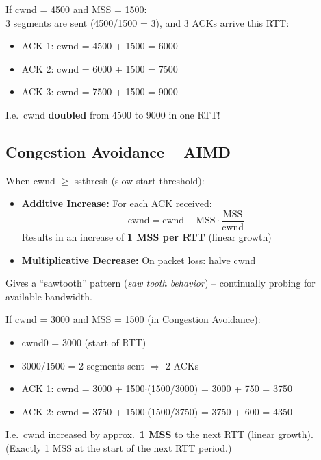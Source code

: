 \begin{exambox}
If cwnd = 4500 and MSS = 1500:\\
3 segments are sent (4500/1500 = 3), and 3 ACKs arrive this RTT:
\begin{itemize}[noitemsep]
    \item ACK 1: cwnd = 4500 + 1500 = 6000
    \item ACK 2: cwnd = 6000 + 1500 = 7500
    \item ACK 3: cwnd = 7500 + 1500 = 9000
\end{itemize}
I.e.\ cwnd \textbf{doubled} from 4500 to 9000 in one RTT!
\end{exambox}

\subsection{Congestion Avoidance -- AIMD}

\begin{keybox}
When cwnd $\geq$ ssthresh (slow start threshold):
\begin{itemize}[noitemsep]
    \item \textbf{Additive Increase:} For each ACK received:
    \[
    \text{cwnd} = \text{cwnd} + \text{MSS} \cdot \frac{\text{MSS}}{\text{cwnd}}
    \]
    Results in an increase of \textbf{1 MSS per RTT} (linear growth)
    \item \textbf{Multiplicative Decrease:} On packet loss: halve cwnd
\end{itemize}
Gives a ``sawtooth'' pattern (\emph{saw tooth behavior}) -- continually probing for available bandwidth.
\end{keybox}

\begin{exambox}
If cwnd = 3000 and MSS = 1500 (in Congestion Avoidance):
\begin{itemize}[noitemsep]
    \item cwnd0 = 3000 (start of RTT)
    \item 3000/1500 = 2 segments sent $\Rightarrow$ 2 ACKs
    \item ACK 1: cwnd = 3000 + 1500$\cdot$(1500/3000) = 3000 + 750 = 3750
    \item ACK 2: cwnd = 3750 + 1500$\cdot$(1500/3750) = 3750 + 600 = 4350
\end{itemize}
I.e.\ cwnd increased by approx.\ \textbf{1 MSS} to the next RTT (linear growth). (Exactly 1 MSS at the start of the next RTT period.)
\end{exambox}

